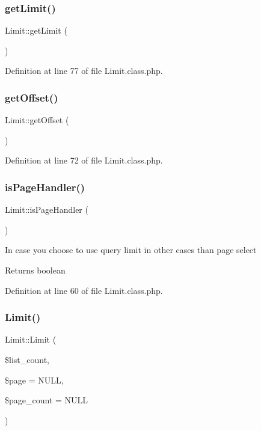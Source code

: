\subsubsection{\texorpdfstring{get\+Limit()}{getLimit()}}
{\footnotesize\ttfamily Limit\+::get\+Limit (\begin{DoxyParamCaption}{ }\end{DoxyParamCaption})}



Definition at line 77 of file Limit.\+class.\+php.

\hypertarget{classLimit_a5dfd9d778f1cfbdaee6114f707a82b48}{}\label{classLimit_a5dfd9d778f1cfbdaee6114f707a82b48} 
\subsubsection{\texorpdfstring{get\+Offset()}{getOffset()}}
{\footnotesize\ttfamily Limit\+::get\+Offset (\begin{DoxyParamCaption}{ }\end{DoxyParamCaption})}



Definition at line 72 of file Limit.\+class.\+php.

\hypertarget{classLimit_a3a30a3752791c509c01ee9b52e774a3c}{}\label{classLimit_a3a30a3752791c509c01ee9b52e774a3c} 
\subsubsection{\texorpdfstring{is\+Page\+Handler()}{isPageHandler()}}
{\footnotesize\ttfamily Limit\+::is\+Page\+Handler (\begin{DoxyParamCaption}{ }\end{DoxyParamCaption})}

In case you choose to use query limit in other cases than page select \begin{DoxyReturn}{Returns}
boolean 
\end{DoxyReturn}


Definition at line 60 of file Limit.\+class.\+php.

\hypertarget{classLimit_a45e8c675dc77b863b87590c76b4113ad}{}\label{classLimit_a45e8c675dc77b863b87590c76b4113ad} 
\subsubsection{\texorpdfstring{Limit()}{Limit()}}
{\footnotesize\ttfamily Limit\+::\+Limit (\begin{DoxyParamCaption}\item[{}]{\$list\+\_\+count,  }\item[{}]{\$page = {\ttfamily NULL},  }\item[{}]{\$page\+\_\+count = {\ttfamily NULL} }\end{DoxyParamCaption})}

